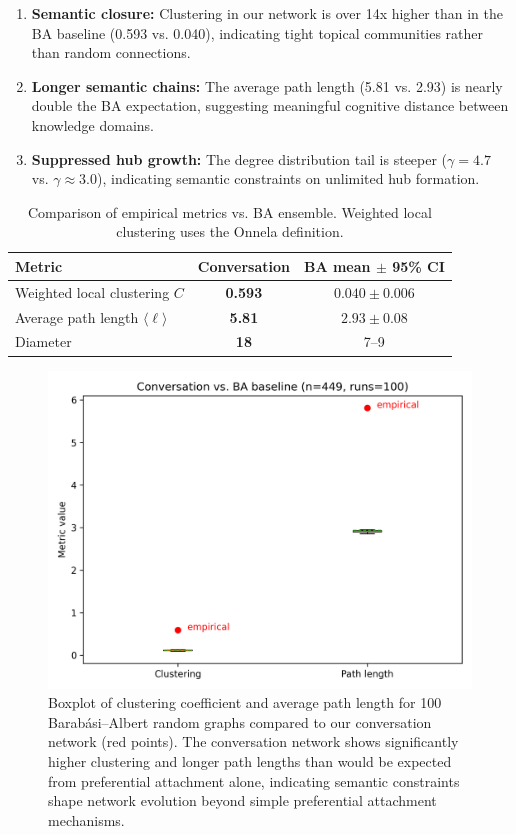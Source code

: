 \documentclass[10pt, a4paper]{article}
\begin{document}
\begin{enumerate}[label=(\alph*)]
    \item \textbf{Semantic closure:} Clustering in our network is over 14x higher than in the BA baseline (0.593 vs. 0.040), indicating tight topical communities rather than random connections.
    \item \textbf{Longer semantic chains:} The average path length (5.81 vs. 2.93) is nearly double the BA expectation, suggesting meaningful cognitive distance between knowledge domains.
    \item \textbf{Suppressed hub growth:} The degree distribution tail is steeper ($\gamma = 4.7$ vs. $\gamma \approx 3.0$), indicating semantic constraints on unlimited hub formation.
  \end{enumerate}
  
\begin{table}
\centering
\begin{tabular}{lcc}
\toprule
Metric & Conversation & BA mean $\pm$ 95\% CI \\
\midrule
Weighted local clustering $C$ & \textbf{0.593} & $0.040 \pm 0.006$ \\
Average path length $\langle \ell \rangle$ & \textbf{5.81} & $2.93 \pm 0.08$ \\
Diameter & \textbf{18} & 7--9 \\
\bottomrule
\end{tabular}
\caption{Comparison of empirical metrics vs. BA ensemble. Weighted local clustering uses the Onnela definition.}
\label{tab:ba-metrics}
\end{table}

\begin{figure}
    \centering
    \includegraphics[width=0.75\linewidth]{images/metrics_boxplot.png}
    \caption{Boxplot of clustering coefficient and average path length for 100 Barabási–Albert random graphs compared to our conversation network (red points). The conversation network shows significantly higher clustering and longer path lengths than would be expected from preferential attachment alone, indicating semantic constraints shape network evolution beyond simple preferential attachment mechanisms.}
    \label{fig:box-ba}
\end{figure}
\end{document}

